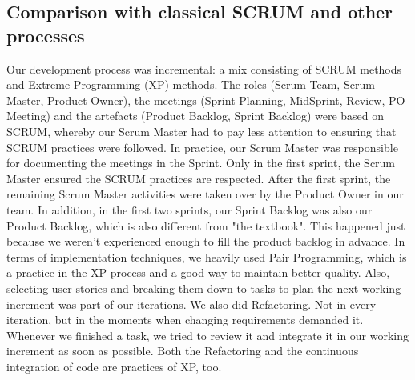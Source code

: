 \subsection{Comparison with classical SCRUM and other processes}
Our development process was incremental: a mix consisting of SCRUM methods and Extreme Programming (XP) methods.
The roles (Scrum Team, Scrum Master, Product Owner), the meetings (Sprint Planning, MidSprint, Review, PO Meeting) and the artefacts (Product Backlog, Sprint Backlog) were based on SCRUM, whereby our Scrum Master had to pay less attention to ensuring that SCRUM practices were followed.
In practice, our Scrum Master was responsible for documenting the meetings in the Sprint.
Only in the first sprint, the Scrum Master ensured the SCRUM practices are respected.
After the first sprint, the remaining Scrum Master activities were taken over by the Product Owner in our team.
In addition, in the first two sprints, our Sprint Backlog was also our Product Backlog, which is also different from "the textbook".
This happened just because we weren't experienced enough to fill the product backlog in advance.
In terms of implementation techniques, we heavily used Pair Programming, which is a practice in the XP process and a good way to maintain better quality.
Also, selecting user stories and breaking them down to tasks to plan the next working increment was part of our iterations.
We also did Refactoring.
Not in every iteration, but in the moments when changing requirements demanded it.
Whenever we finished a task, we tried to review it and integrate it in our working increment as soon as possible.
Both the Refactoring and the continuous integration of code are practices of XP, too.
